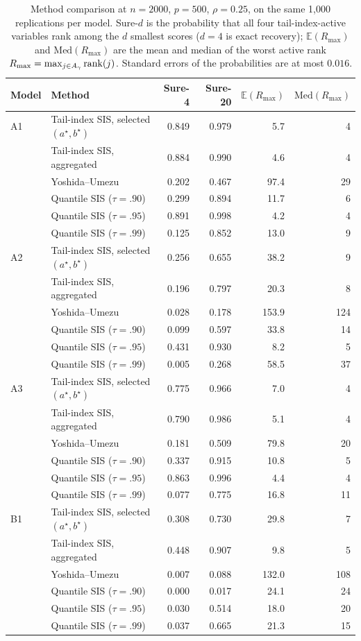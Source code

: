 \begin{table}[t]
\centering
\caption{Method comparison at $n=2000$, $p=500$, $\rho=0.25$, on the same 1{,}000 replications per model. Sure-$d$ is the probability that all four tail-index-active variables rank among the $d$ smallest scores ($d=4$ is exact recovery); $\mathbb{E}(R_{\max})$ and $\mathrm{Med}(R_{\max})$ are the mean and median of the worst active rank $R_{\max}=\max_{j\in A_\gamma}\mathrm{rank}(j)$. Standard errors of the probabilities are at most $0.016$.}
\label{tab:cmp500}
\begin{tabular}{llrrrr}
\toprule
Model & Method & Sure-4 & Sure-20 & $\mathbb{E}(R_{\max})$ & $\mathrm{Med}(R_{\max})$\\
\midrule
A1 & Tail-index SIS, selected $(a^\star,b^\star)$ & 0.849 & 0.979 & 5.7 & 4\\
 & Tail-index SIS, aggregated & 0.884 & 0.990 & 4.6 & 4\\
 & Yoshida--Umezu & 0.202 & 0.467 & 97.4 & 29\\
 & Quantile SIS ($\tau=.90$) & 0.299 & 0.894 & 11.7 & 6\\
 & Quantile SIS ($\tau=.95$) & 0.891 & 0.998 & 4.2 & 4\\
 & Quantile SIS ($\tau=.99$) & 0.125 & 0.852 & 13.0 & 9\\
\addlinespace
A2 & Tail-index SIS, selected $(a^\star,b^\star)$ & 0.256 & 0.655 & 38.2 & 9\\
 & Tail-index SIS, aggregated & 0.196 & 0.797 & 20.3 & 8\\
 & Yoshida--Umezu & 0.028 & 0.178 & 153.9 & 124\\
 & Quantile SIS ($\tau=.90$) & 0.099 & 0.597 & 33.8 & 14\\
 & Quantile SIS ($\tau=.95$) & 0.431 & 0.930 & 8.2 & 5\\
 & Quantile SIS ($\tau=.99$) & 0.005 & 0.268 & 58.5 & 37\\
\addlinespace
A3 & Tail-index SIS, selected $(a^\star,b^\star)$ & 0.775 & 0.966 & 7.0 & 4\\
 & Tail-index SIS, aggregated & 0.790 & 0.986 & 5.1 & 4\\
 & Yoshida--Umezu & 0.181 & 0.509 & 79.8 & 20\\
 & Quantile SIS ($\tau=.90$) & 0.337 & 0.915 & 10.8 & 5\\
 & Quantile SIS ($\tau=.95$) & 0.863 & 0.996 & 4.4 & 4\\
 & Quantile SIS ($\tau=.99$) & 0.077 & 0.775 & 16.8 & 11\\
\addlinespace
B1 & Tail-index SIS, selected $(a^\star,b^\star)$ & 0.308 & 0.730 & 29.8 & 7\\
 & Tail-index SIS, aggregated & 0.448 & 0.907 & 9.8 & 5\\
 & Yoshida--Umezu & 0.007 & 0.088 & 132.0 & 108\\
 & Quantile SIS ($\tau=.90$) & 0.000 & 0.017 & 24.1 & 24\\
 & Quantile SIS ($\tau=.95$) & 0.030 & 0.514 & 18.0 & 20\\
 & Quantile SIS ($\tau=.99$) & 0.037 & 0.665 & 21.3 & 15\\
\bottomrule
\end{tabular}
\end{table}
